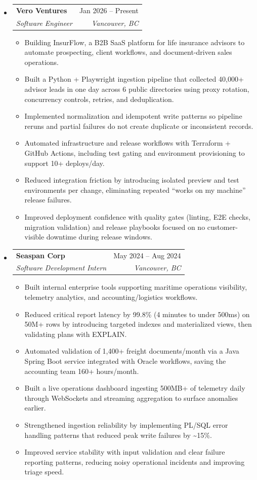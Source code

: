 \documentclass[a4paper,10pt]{article}
\makeatletter
\newcommand{\resumeItem}[1]{%
  \item\small{#1\vspace{-1pt}}%
}
\newcommand{\resumeSubheading}[4]{%
  \vspace{1pt}\item
  \begin{tabular*}{0.97\textwidth}[t]{l@{\extracolsep{\fill}}r}
    \textbf{#1} & #2 \\
    \textit{\small #3} & \textit{\small #4} \\
  \end{tabular*}\vspace{-6pt}%
}
\newcommand{\resumeItemListStart}{\begin{itemize}[itemsep=2pt]}
\newcommand{\resumeItemListEnd}{\end{itemize}\vspace{-2pt}}
\makeatother
\begin{document}
\begin{itemize}[leftmargin=0.15in, label={}]

  \resumeSubheading
    {Vero Ventures}{Jan 2026 -- Present}
    {Software Engineer}{Vancouver, BC}
  \resumeItemListStart
    \resumeItem{Building InsurFlow, a B2B SaaS platform for life insurance advisors to automate prospecting, client workflows, and document-driven sales operations.}
    \resumeItem{Built a Python + Playwright ingestion pipeline that collected 40,000+ advisor leads in one day across 6 public directories using proxy rotation, concurrency controls, retries, and deduplication.}
    \resumeItem{Implemented normalization and idempotent write patterns so pipeline reruns and partial failures do not create duplicate or inconsistent records.}
    \resumeItem{Automated infrastructure and release workflows with Terraform + GitHub Actions, including test gating and environment provisioning to support 10+ deploys/day.}
    \resumeItem{Reduced integration friction by introducing isolated preview and test environments per change, eliminating repeated ``works on my machine'' release failures.}
    \resumeItem{Improved deployment confidence with quality gates (linting, E2E checks, migration validation) and release playbooks focused on no customer-visible downtime during release windows.}
  \resumeItemListEnd

  \resumeSubheading
    {Seaspan Corp}{May 2024 -- Aug 2024}
    {Software Development Intern}{Vancouver, BC}
  \resumeItemListStart
    \resumeItem{Built internal enterprise tools supporting maritime operations visibility, telemetry analytics, and accounting/logistics workflows.}
    \resumeItem{Reduced critical report latency by 99.8\% (4 minutes to under 500ms) on 50M+ rows by introducing targeted indexes and materialized views, then validating plans with EXPLAIN.}
    \resumeItem{Automated validation of 1,400+ freight documents/month via a Java Spring Boot service integrated with Oracle workflows, saving the accounting team 160+ hours/month.}
    \resumeItem{Built a live operations dashboard ingesting 500MB+ of telemetry daily through WebSockets and streaming aggregation to surface anomalies earlier.}
    \resumeItem{Strengthened ingestion reliability by implementing PL/SQL error handling patterns that reduced peak write failures by \textasciitilde 15\%.}
    \resumeItem{Improved service stability with input validation and clear failure reporting patterns, reducing noisy operational incidents and improving triage speed.}
  \resumeItemListEnd


\end{itemize}
\end{document}
